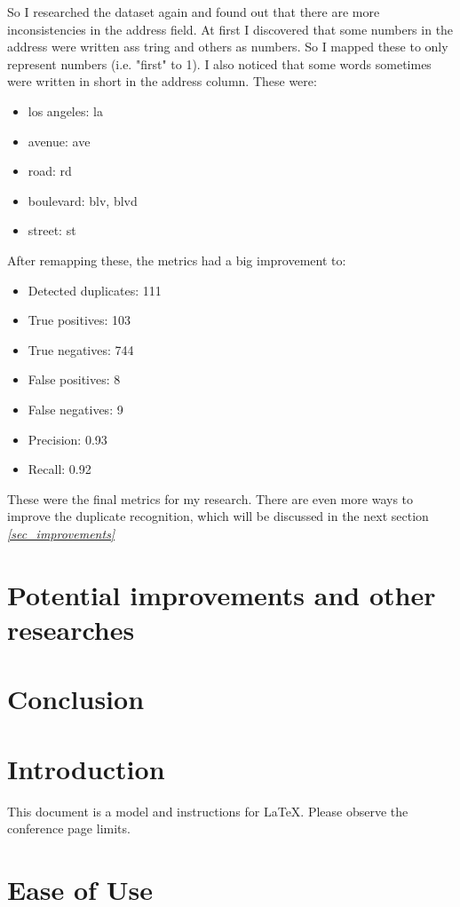 \documentclass[conference]{IEEEtran}
\newcommand*{\fullref}[1]{\textit{\hyperref[{#1}]{\autoref*{#1} \nameref*{#1}}}}
\begin{document}
So I researched the dataset again and found out that there are more inconsistencies in the address field. At first I discovered that some numbers in the address were written ass tring and others as numbers. So I mapped these to only represent numbers (i.e. "first" to 1). I also noticed that some words sometimes were written in short in the address column. These were: 
\begin{itemize}
	\item los angeles: la
	\item avenue: ave
	\item road: rd
	\item boulevard: blv, blvd
	\item street: st
\end{itemize}
After remapping these, the metrics had a big improvement to: 
\begin{itemize}
	\item Detected duplicates: 111
	\item True positives: 103
	\item True negatives: 744
	\item False positives: 8
	\item False negatives: 9
	\item Precision: 0.93
	\item Recall: 0.92
\end{itemize}
These were the final metrics for my research. There are even more ways to improve the duplicate recognition, which will be discussed in the next section \fullref{sec_improvements}
\section{Potential improvements and other researches} \label{sec_imporvements}
\section{Conclusion}


\newpage 
\newpage 
\newpage 
\section{Introduction}
This document is a model and instructions for \LaTeX.
Please observe the conference page limits. 

\section{Ease of Use}
\end{document}
